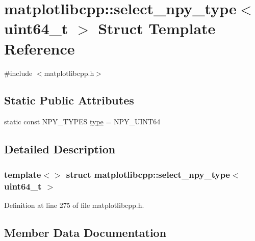 \hypertarget{structmatplotlibcpp_1_1select__npy__type_3_01uint64__t_01_4}{}\section{matplotlibcpp\+::select\+\_\+npy\+\_\+type$<$ uint64\+\_\+t $>$ Struct Template Reference}
\label{structmatplotlibcpp_1_1select__npy__type_3_01uint64__t_01_4}


{\ttfamily \#include $<$matplotlibcpp.\+h$>$}

\subsection*{Static Public Attributes}
\begin{DoxyCompactItemize}
\item 
static const N\+P\+Y\+\_\+\+T\+Y\+P\+ES \mbox{\hyperlink{structmatplotlibcpp_1_1select__npy__type_3_01uint64__t_01_4_a8d5871452f90ff04452f0416bee54fca}{type}} = N\+P\+Y\+\_\+\+U\+I\+N\+T64
\end{DoxyCompactItemize}


\subsection{Detailed Description}
\subsubsection*{template$<$$>$\newline
struct matplotlibcpp\+::select\+\_\+npy\+\_\+type$<$ uint64\+\_\+t $>$}



Definition at line 275 of file matplotlibcpp.\+h.



\subsection{Member Data Documentation}
\mbox{\label{structmatplotlibcpp_1_1select__npy__type_3_01uint64__t_01_4_a8d5871452f90ff04452f0416bee54fca}} 
